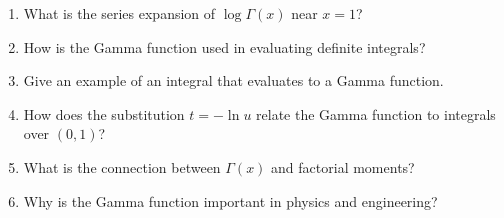 \begin{enumerate}
  \item What is the series expansion of $\log \Gamma(x)$ near $x=1$?
  \item How is the Gamma function used in evaluating definite integrals?
  \item Give an example of an integral that evaluates to a Gamma function.
  \item How does the substitution $t = -\ln u$ relate the Gamma function to integrals over $(0,1)$?
  \item What is the connection between $\Gamma(x)$ and factorial moments?
  \item Why is the Gamma function important in physics and engineering?
\end{enumerate}
